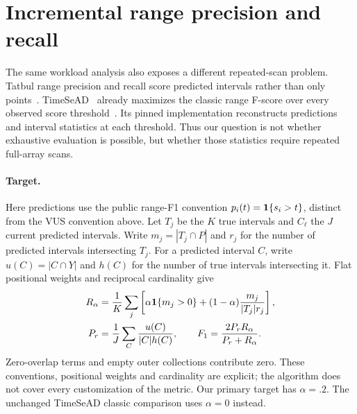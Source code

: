 \section{Incremental range precision and recall}
The same workload analysis also exposes a different repeated-scan problem.
Tatbul range precision and recall score predicted intervals rather than only
points~\cite{tatbul2018}. TimeSeAD~\cite{wagner2023timesead} already maximizes the classic range F-score
over every observed score threshold~\cite{timeseadclassic}. Its pinned implementation
reconstructs predictions and interval statistics at each threshold. Thus our
question is not whether exhaustive evaluation is possible, but whether those
statistics require repeated full-array scans.

\paragraph{Target.}
Here predictions use the public range-F1 convention $p_i(t)=\mathbf{1}\{s_i>t\}$,
distinct from the VUS convention above. Let $T_j$ be the $K$ true intervals and
$C_\ell$ the $J$ current predicted intervals. Write $m_j=|T_j\cap P|$ and $r_j$
for the number of predicted intervals intersecting $T_j$. For a predicted
interval $C$, write $u(C)=|C\cap Y|$ and $h(C)$ for the number of true intervals
intersecting it. Flat positional weights and reciprocal cardinality give
\begin{align}
 R_\alpha&=\frac1K\sum_j\left[\alpha\mathbf{1}\{m_j>0\}
 +(1-\alpha)\frac{m_j}{|T_j|r_j}\right],\\
 P_r&=\frac1J\sum_C\frac{u(C)}{|C|h(C)},\qquad
 F_1=\frac{2P_rR_\alpha}{P_r+R_\alpha}.
\end{align}
Zero-overlap terms and empty outer collections contribute zero. These
conventions, positional weights and cardinality are explicit; the algorithm
does not cover every customization of the metric. Our primary target has
$\alpha=.2$. The unchanged TimeSeAD classic comparison uses $\alpha=0$ instead.

